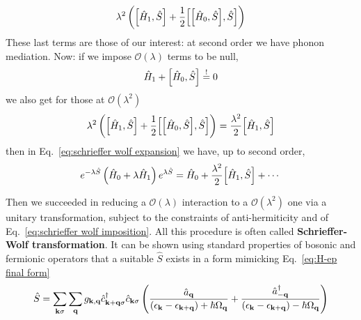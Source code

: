 \[
	\lambda^2 \lrR{\comm{\hat H_1}{\hat S} + \half \comm{\comm{\hat H_0}{\hat S}}{\hat S \vphantom{A^A}}}
\]
These last terms are those of our interest: at second order we have phonon mediation.
Now: if we impose $\mathcal{O}(\lambda)$ terms to be null,
\begin{equation}\label{eq:schrieffer wolf imposition}
	\hat H_1 + \comm{\hat H_0}{\hat S} \imp 0
\end{equation}
we also get for those at $\mathcal{O}(\lambda^2)$
\[
	\lambda^2 \lrR{\comm{\hat H_1}{\hat S} + \half \comm{\comm{\hat H_0}{\hat S}}{\hat S \vphantom{A^A}}} = \frac{\lambda^2}{2} \comm{\hat H_1}{\hat S}
\]
then in Eq.~\eqref{eq:schrieffer wolf expansion} we have, up to second order,
\begin{equation}\label{eq:schrieffer wolf final}
	e^{-\lambda \hat S} \lrR{\hat H_0 + \lambda \hat H_1} e^{\lambda \hat S} = \hat H_0 + \frac{\lambda^2}{2} \comm{\hat H_1}{\hat S} + \cdots
\end{equation}

Then we succeeded in reducing a $\mathcal{O}(\lambda)$ interaction to a $\mathcal{O}(\lambda^2)$ one via a unitary transformation, subject to the constraints of anti-hermiticity and of Eq.~\eqref{eq:schrieffer wolf imposition}. All this procedure is often called \textbf{Schrieffer-Wolf transformation}.
It can be shown using standard properties of bosonic and fermionic operators that a suitable $\hat S$ exists in a form mimicking Eq.~\eqref{eq:H-ep final form}
\begin{equation}\label{eq:schrieffer-wolf S operator}
	\hat S = \sum_{\mathbf{k}\sigma} \sum_\mathbf{q} g_{\mathbf{k},\mathbf{q}} \hat{c}_{\mathbf{k}+\mathbf{q}\sigma}^\dagger \hat{c}_{\mathbf{k}\sigma} \left({
		\frac{\hat{a}_\mathbf{q}}{\left({\epsilon_\mathbf{k} - \epsilon_{\mathbf{k}+\mathbf{q}}}\right)+\hbar\Omega_\mathbf{q}} + \frac{\hat{a}_{-\mathbf{q}}^\dagger}{\left({\epsilon_\mathbf{k} - \epsilon_{\mathbf{k}+\mathbf{q}}}\right)-\hbar\Omega_\mathbf{q}}
	}\right)
\end{equation}

